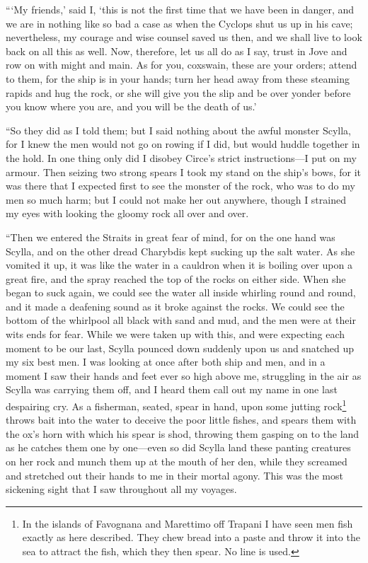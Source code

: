 “‘My friends,’ said I, ‘this is not the first time that we have been in danger,
and we are in nothing like so bad a case as when the Cyclops shut us up in his
cave; nevertheless, my courage and wise counsel saved us then, and we shall
live to look back on all this as well. Now, therefore, let us all do as I say,
trust in Jove and row on with might and main. As for you, coxswain, these are
your orders; attend to them, for the ship is in your hands; turn her head away
from these steaming rapids and hug the rock, or she will give you the slip and
be over yonder before you know where you are, and you will be the death of us.’

“So they did as I told them; but I said nothing about the awful monster Scylla,
for I knew the men would not go on rowing if I did, but would huddle together
in the hold. In one thing only did I disobey Circe’s strict instructions—I put
on my armour. Then seizing two strong spears I took my stand on the ship’s
bows, for it was there that I expected first to see the monster of the rock,
who was to do my men so much harm; but I could not make her out anywhere,
though I strained my eyes with looking the gloomy rock all over and over.

“Then we entered the Straits in great fear of mind, for on the one hand was
Scylla, and on the other dread Charybdis kept sucking up the salt water. As she
vomited it up, it was like the water in a cauldron when it is boiling over upon
a great fire, and the spray reached the top of the rocks on either side. When
she began to suck again, we could see the water all inside whirling round and
round, and it made a deafening sound as it broke against the rocks. We could
see the bottom of the whirlpool all black with sand and mud, and the men were
at their wits ends for fear. While we were taken up with this, and were
expecting each moment to be our last, Scylla pounced down suddenly upon us and
snatched up my six best men. I was looking at once after both ship and men, and
in a moment I saw their hands and feet ever so high above me, struggling in the
air as Scylla was carrying them off, and I heard them call out my name in one
last despairing cry. As a fisherman, seated, spear in hand, upon some jutting
rock\footnote{In the islands of Favognana and Marettimo off Trapani I have seen men fish
exactly as here described. They chew bread into a paste and throw it into the
sea to attract the fish, which they then spear. No line is used.} throws
bait into the water to deceive the poor little fishes, and spears them with the
ox’s horn with which his spear is shod, throwing them gasping on to the land as
he catches them one by one—even so did Scylla land these panting creatures on
her rock and munch them up at the mouth of her den, while they screamed and
stretched out their hands to me in their mortal agony. This was the most
sickening sight that I saw throughout all my voyages.

